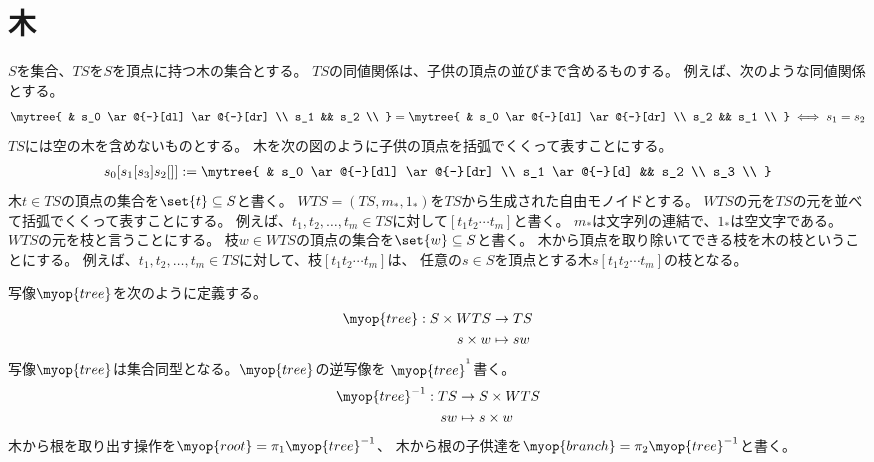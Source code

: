 \section{木}\label{s1:木} %
	$S$を集合、$TS$を$S$を頂点に持つ木の集合とする。
	$TS$の同値関係は、子供の頂点の並びまで含めるものする。
	例えば、次のような同値関係とする。
	\begin{equation*}\begin{split} %
		\mytree{
			& s_0 \ar@{-}[dl] \ar@{-}[dr] \\
			s_1 && s_2 \\
		} = \mytree{
			& s_0 \ar@{-}[dl] \ar@{-}[dr] \\
			s_2 && s_1 \\
		} \iff s_1 = s_2
	\end{split}\end{equation*} %
	$TS$には空の木を含めないものとする。
	木を次の図のように子供の頂点を括弧でくくって表すことにする。
	\begin{equation*}\begin{split} %
		s_0[s_1[s_3]s_2[]] := \mytree{
			& s_0 \ar@{-}[dl] \ar@{-}[dr] \\
			s_1 \ar@{-}[d] && s_2 \\
			s_3 \\
		}
	\end{split}\end{equation*} %
	木$t\in TS$の頂点の集合を$\set{t}\subseteq S$と書く。
	$WTS=(TS,m_*,1_*)$を$TS$から生成された自由モノイドとする。
	$WTS$の元を$TS$の元を並べて括弧でくくって表すことにする。
	例えば、$t_1,t_2,\dots,t_m\in TS$に対して$[t_1t_2\cdots t_m]$と書く。
	$m_*$は文字列の連結で、$1_*$は空文字である。
	$WTS$の元を枝と言うことにする。
	枝$w\in WTS$の頂点の集合を$\set{w}\subseteq S$と書く。
	木から頂点を取り除いてできる枝を木の枝ということにする。
	例えば、$t_1,t_2,\dots,t_m\in TS$に対して、枝$[t_1t_2\cdots t_m]$は、
	任意の$s\in S$を頂点とする木$s[t_1t_2\cdots t_m]$の枝となる。

	写像$\myop{tree}$を次のように定義する。
	\begin{equation}\begin{split} %
		\myop{tree}: S\times WTS &\to TS \\
		s\times w &\mapsto sw \\
	\end{split}\end{equation} %
	写像$\myop{tree}$は集合同型となる。$\myop{tree}$の逆写像を
	$\myop{tree}^{^1}$書く。
	\begin{equation}\begin{split} %
		\myop{tree}^{-1}: TS &\to S\times WTS \\
		sw &\mapsto s\times w \\
	\end{split}\end{equation} %
	木から根を取り出す操作を$\myop{root}=\pi_1\myop{tree}^{-1}$、
	木から根の子供達を$\myop{branch}=\pi_2\myop{tree}^{-1}$と書く。

